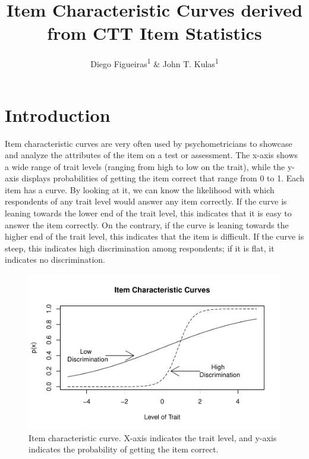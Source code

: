 \documentclass[
  english,
  man,floatsintext]{apa6}
\title{Item Characteristic Curves derived from CTT Item Statistics}
\author{Diego Figueiras\textsuperscript{1} \& John T. Kulas\textsuperscript{1}}
\date{}
\affiliation{\vspace{0.5cm}\textsuperscript{1} Montclair State University}
\begin{document}
\maketitle

\hypertarget{introduction}{%
\section{Introduction}\label{introduction}}

Item characteristic curves are very often used by psychometricians to showcase and analyze the attributes of the item on a test or assessment. The x-axis shows a wide range of trait levels (ranging from high to low on the trait), while the y-axis displays probabilities of getting the item correct that range from 0 to 1. Each item has a curve. By looking at it, we can know the likelihood with which respondents of any trait level would answer any item correctly. If the curve is leaning towards the lower end of the trait level, this indicates that it is easy to answer the item correctly. On the contrary, if the curve is leaning towards the higher end of the trait level, this indicates that the item is difficult. If the curve is steep, this indicates high discrimination among respondents; if it is flat, it indicates no discrimination.

\begin{figure}
\centering
\includegraphics{ICC_project_files/figure-latex/unnamed-chunk-1-1.pdf}
\caption{\label{fig:unnamed-chunk-1}Item characteristic curve. X-axis indicates the trait level, and y-axis indicates the probability of getting the item correct.}
\end{figure}
\end{document}
